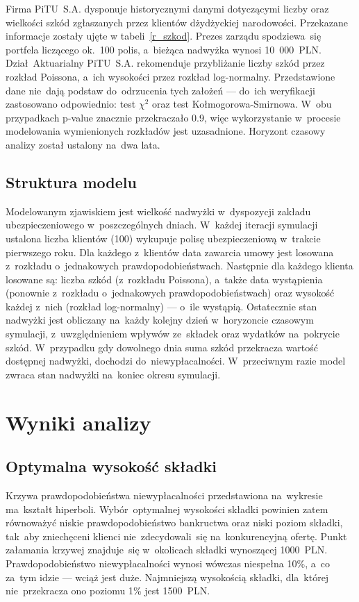 \documentclass[12pt, a4paper, oneside]{mwart} %
\begin{document}
Firma PiTU~S.A. dysponuje historycznymi danymi dotyczącymi liczby oraz wielkości szkód zgłaszanych przez klientów dżydżyckiej narodowości. Przekazane informacje zostały ujęte w tabeli~\ref{r_szkod}. Prezes zarządu spodziewa~się portfela liczącego ok.~100 polis, a~bieżąca nadwyżka wynosi 10~000~PLN. Dział~Aktuarialny PiTU~S.A. rekomenduje przybliżanie liczby szkód przez rozkład Poissona, a~ich wysokości przez rozkład log-normalny. Przedstawione dane nie~dają podstaw do~odrzucenia tych założeń --- do~ich weryfikacji zastosowano odpowiednio: test $\chi^2$ oraz test Kołmogorowa-Smirnowa. W~obu przypadkach p-value znacznie przekraczało 0.9, więc wykorzystanie w~procesie modelowania wymienionych rozkładów jest uzasadnione. Horyzont czasowy analizy został ustalony na~dwa lata.

\subsection{Struktura modelu}
Modelowanym zjawiskiem jest wielkość nadwyżki w~dyspozycji zakładu ubezpieczeniowego w~poszczególnych dniach. W~każdej iteracji symulacji ustalona liczba klientów (100) wykupuje polisę ubezpieczeniową w~trakcie pierwszego roku. Dla każdego z~klientów data zawarcia umowy jest losowana z~rozkładu o~jednakowych prawdopodobieństwach. Następnie dla każdego klienta losowane są: liczba szkód (z~rozkładu Poissona), a~także data wystąpienia (ponownie z~rozkładu o~jednakowych prawdopodobieństwach) oraz wysokość każdej z~nich (rozkład log-normalny) --- o~ile wystąpią. Ostatecznie stan nadwyżki jest obliczany na~każdy kolejny dzień w~horyzoncie czasowym symulacji, z~uwzględnieniem wpływów ze~składek oraz wydatków na~pokrycie szkód. W~przypadku gdy dowolnego dnia suma szkód przekracza wartość dostępnej nadwyżki, dochodzi do~niewypłacalności. W~przeciwnym razie model zwraca stan nadwyżki na~koniec okresu symulacji.

\section{Wyniki analizy}

\subsection{Optymalna wysokość składki}
Krzywa prawdopodobieństwa niewypłacalności przedstawiona na~wykresie ma~kształt hiperboli. Wybór~optymalnej wysokości składki powinien zatem równoważyć niskie prawdopodobieństwo bankructwa oraz niski poziom składki, tak~aby zniechęceni klienci nie~zdecydowali~się na~konkurencyjną ofertę. Punkt załamania krzywej znajduje~się w~okolicach składki wynoszącej 1000~PLN. Prawdopodobieństwo niewypłacalności wynosi wówczas niespełna 10\%, a~co za~tym idzie --- wciąż jest duże. Najmniejszą wysokością składki, dla~której nie~przekracza ono poziomu 1\% jest 1500~PLN.
\end{document}
